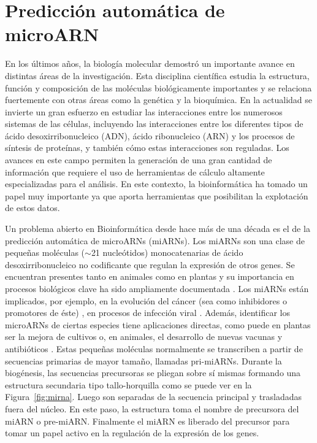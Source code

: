 \section{Predicción automática de microARN}

En los últimos años, la biología molecular demostró un importante avance en distintas áreas de la investigación. Esta disciplina científica
estudia la estructura, función y composición de las moléculas biológicamente importantes y se relaciona fuertemente con otras áreas como la
genética y la bioquímica. En la actualidad se invierte un gran esfuerzo en estudiar las interacciones entre los numerosos sistemas de las células,
incluyendo las interacciones entre los diferentes tipos de ácido desoxirribonucleico (ADN), ácido ribonucleico (ARN) y los procesos de síntesis de
proteínas, y también cómo estas interacciones son reguladas. Los avances en este campo permiten la generación de una gran cantidad de información
que requiere el uso de herramientas de cálculo altamente especializadas para el análisis. En este contexto, la bioinformática ha tomado un papel muy
importante ya que aporta herramientas que posibilitan la explotación de estos datos.

Un problema abierto en Bioinformática desde hace más de una década es el de la predicción automática de microARNs (miARNs). Los miARNs son una clase de
pequeñas moléculas ($\sim$21 nucleótidos) monocatenarias de ácido desoxirribonucleico no codificante que regulan la expresión de otros genes. Se
encuentran presentes tanto en animales como en plantas y su importancia en procesos biológicos clave ha sido ampliamente documentada
\citep{rosenzvit2013microrna}. Los miARNs están implicados, por ejemplo, en la evolución del cáncer (sea como inhibidores o promotores de éste)
\citep{yu2015microrna}, en procesos de infección viral \citep{lecellier2005}. Además, identificar los microARNs de ciertas especies tiene aplicaciones
directas, como puede en plantas ser la mejora de cultivos \citep{liu2010new} o, en animales,  el desarrollo de nuevas vacunas y antibióticos
\citep{tsetsarkin2017synergistic}. Estas pequeñas moléculas normalmente se transcriben a partir de secuencias primarias de mayor tamaño, llamadas
pri-miARNs. Durante la biogénesis, las secuencias precursoras se pliegan sobre sí mismas formando una estructura secundaria tipo tallo-horquilla como se
puede ver en la Figura~\ref{fig:mirna}. Luego son separadas de la secuencia principal y trasladadas fuera del núcleo. En este paso, la estructura toma el
nombre de precursora del miARN o pre-miARN. Finalmente el miARN es liberado del precursor para tomar un papel activo en la regulación de la expresión de los
genes.

